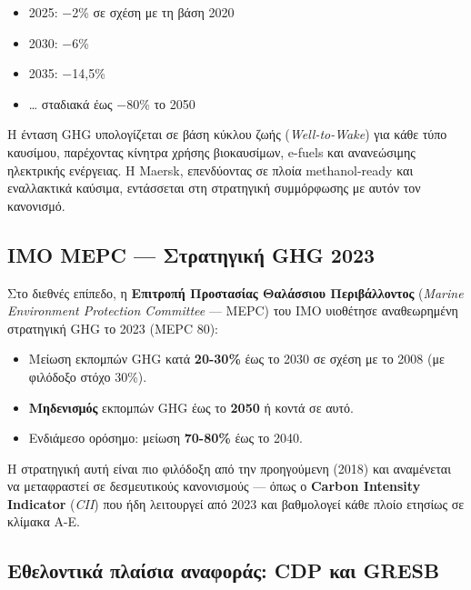 \begin{itemize}
\tightlist
\item
  2025: −2\% σε σχέση με τη βάση 2020
\item
  2030: −6\%
\item
  2035: −14,5\%
\item
  \ldots{} σταδιακά έως −80\% το 2050
\end{itemize}

Η ένταση GHG υπολογίζεται σε βάση κύκλου ζωής (\emph{Well-to-Wake}) για
κάθε τύπο καυσίμου, παρέχοντας κίνητρα χρήσης βιοκαυσίμων, e-fuels και
ανανεώσιμης ηλεκτρικής ενέργειας. Η Maersk, επενδύοντας σε πλοία
methanol-ready και εναλλακτικά καύσιμα, εντάσσεται στη στρατηγική
συμμόρφωσης με αυτόν τον κανονισμό.

\subsection{IMO MEPC --- Στρατηγική GHG
2023}\label{imo-mepc-ux3c3ux3c4ux3c1ux3b1ux3c4ux3b7ux3b3ux3b9ux3baux3ae-ghg-2023}

Στο διεθνές επίπεδο, η \textbf{Επιτροπή Προστασίας Θαλάσσιου
Περιβάλλοντος} (\emph{Marine Environment Protection Committee} --- MEPC)
του IMO υιοθέτησε αναθεωρημένη στρατηγική GHG το 2023 (MEPC 80):

\begin{itemize}
\tightlist
\item
  Μείωση εκπομπών GHG κατά \textbf{20-30\%} έως το 2030 σε σχέση με το
  2008 (με φιλόδοξο στόχο 30\%).
\item
  \textbf{Μηδενισμός} εκπομπών GHG έως το \textbf{2050} ή κοντά σε αυτό.
\item
  Ενδιάμεσο ορόσημο: μείωση \textbf{70-80\%} έως το 2040.
\end{itemize}

Η στρατηγική αυτή είναι πιο φιλόδοξη από την προηγούμενη (2018) και
αναμένεται να μεταφραστεί σε δεσμευτικούς κανονισμούς --- όπως ο
\textbf{Carbon Intensity Indicator} (\emph{CII}) που ήδη λειτουργεί από
2023 και βαθμολογεί κάθε πλοίο ετησίως σε κλίμακα A-E.

\subsection{Εθελοντικά πλαίσια αναφοράς: CDP και
GRESB}\label{ux3b5ux3b8ux3b5ux3bbux3bfux3bdux3c4ux3b9ux3baux3ac-ux3c0ux3bbux3b1ux3afux3c3ux3b9ux3b1-ux3b1ux3bdux3b1ux3c6ux3bfux3c1ux3acux3c2-cdp-ux3baux3b1ux3b9-gresb}

